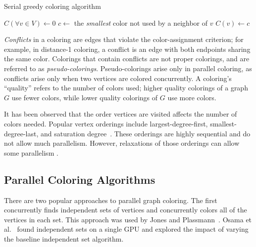 \begin{algorithm}
  \caption{Serial greedy coloring algorithm}
  \label{IAB:alg:serialgreed}
  \begin{algorithmic}
      \State $C(\forall v \in V) \gets 0$ 
        \State $c \gets$ the \emph{smallest} color not used by a neighbor of $v$
        \State $C(v) \gets c$
      \EndFor
    \EndProcedure
  \end{algorithmic}
\end{algorithm}

\emph{Conflicts} in a coloring are edges that violate the color-assignment criterion; for example, in distance-1 coloring, a conflict is an edge with both endpoints sharing the same color.
Colorings that contain conflicts are not proper colorings, and are referred to as \emph{pseudo-colorings}.
Pseudo-colorings arise only in parallel coloring, as conflicts arise only when two vertices are colored concurrently.
A coloring's ``quality'' refers to the number of colors used; higher quality colorings of a graph $G$ use fewer colors, while lower quality colorings of $G$ use more colors.


It has been observed that the order vertices are visited affects the number of colors needed.
Popular vertex orderings include largest-degree-first, smallest-degree-last, and saturation degree~\cite{Besta20}. 
These orderings are highly sequential and do not allow much parallelism. However, relaxations of those orderings
can allow some parallelism \cite{Hasenplaugh14}.


\subsection{Parallel Coloring Algorithms}

There are two popular approaches to parallel graph coloring.
The first concurrently finds independent sets of vertices and concurrently colors all of the vertices in each set. This approach was used by 
Jones and Plassmann~\cite{IAB:jones1993parallel}.
Osama et al.~\cite{osama19} found independent sets on a single GPU and explored the impact of varying the baseline independent set algorithm.


